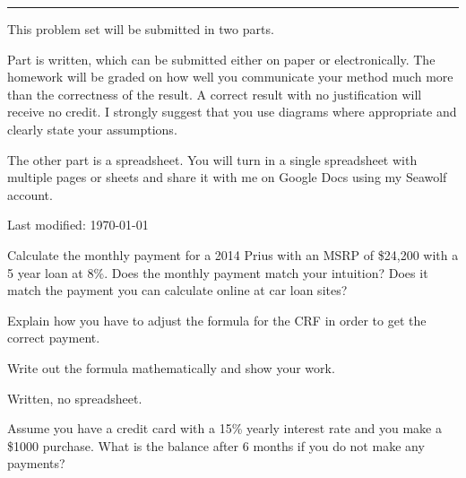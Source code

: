 \documentclass{article}
\begin{document}
\hrule
\vspace{10pt}

This problem set will be submitted in two parts.

Part is written, which can be submitted either on paper or
electronically.  The homework will be graded on how well you communicate
your method much more than the correctness of the result.  A correct
result with no justification will receive no credit.  I strongly
suggest that you use diagrams where appropriate and clearly state your
assumptions.

The other part is a spreadsheet.  You will turn in a single spreadsheet
with multiple pages or sheets and share it with me on Google Docs using
my Seawolf account.

{\tiny Last modified: \today}


Calculate the monthly payment for a 2014 Prius with an MSRP of \$24,200
with a 5 year loan at 8\%.  Does the monthly payment match your
intuition?  Does it match the payment you can calculate online at car
loan sites?

Explain how you have to adjust the formula for the CRF in order to get
the correct payment.

Write out the formula mathematically and show your work.

Written, no spreadsheet.



Assume you have a credit card with a 15\% yearly interest rate and you make a
\$1000 purchase.  What is the balance after 6 months if you do not make
any payments?
\end{document}
